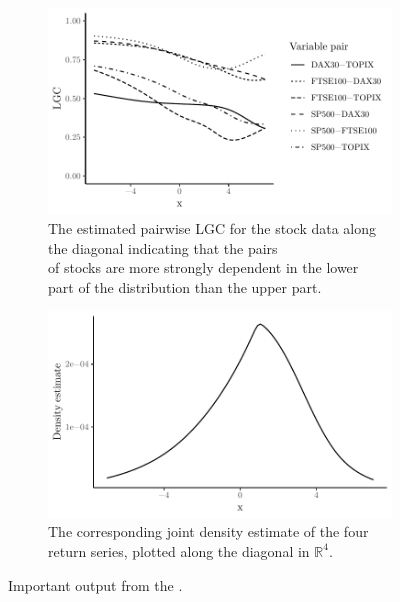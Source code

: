 \begin{figure}[t]
    \centering
    \begin{subfigure}[t]{0.48\textwidth}
      \includegraphics[width=\textwidth]{loccor-example}
      \caption{The estimated pairwise LGC for the stock \newline data along the diagonal indicating that the pairs \\ of stocks are more strongly dependent in the lower \\ part of the distribution than the upper part.}
      \label{fig:lgc-plot1}
    \end{subfigure}
    \begin{subfigure}[t]{0.48\textwidth}
      \includegraphics[width=\textwidth]{density-example}
      \caption{The corresponding joint density estimate of the four return series, plotted along the diagonal in $\mathbb{R}^4$.}
      \label{fig:lgc-plot2}
    \end{subfigure}
    \caption{Important output from the .}
    \label{fig:lgc-plot}
  \end{figure}

